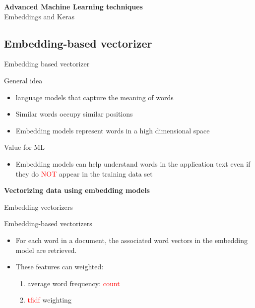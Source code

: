 \documentclass{beamer}
\begin{document}
\begin{frame}[plain]
\vspace{2cm}
\textbf{Advanced Machine Learning techniques} \\
Embeddings and Keras
\vspace{2cm}
\end{frame}


\subsection{Embedding-based vectorizer}

\begin{frame}{Embedding based vectorizer}

\begin{block}{General idea}
	\begin{itemize}[<+->]
		\item language models that capture the meaning of words
		\item Similar words occupy similar positions
		\item Embedding models represent words in a high dimensional space 
	\end{itemize}
\end{block}

\pause
\begin{exampleblock}{Value for ML}
	\begin{itemize}
		\item Embedding models can help understand words in the application text even if they do \textcolor{red}{NOT} appear in the training data set
	\end{itemize}
\end{exampleblock}
\end{frame}


\begin{frame}[plain]
\textbf{Vectorizing data using embedding models}
\end{frame}

\begin{frame}{Embedding vectorizers}
\begin{block}{Embedding-based vectorizers}
	\begin{itemize}[<+->]
		\item For each word in a document, the associated word vectors in the embedding model are retrieved. 
		\item These features can weighted: 
		\begin{enumerate}
			\item average word frequency: \textcolor{red}{count}
			\item \textcolor{red}{tfidf} weighting
	\end{enumerate}
	\end{itemize}
\end{block}
\end{frame}
\end{document}
